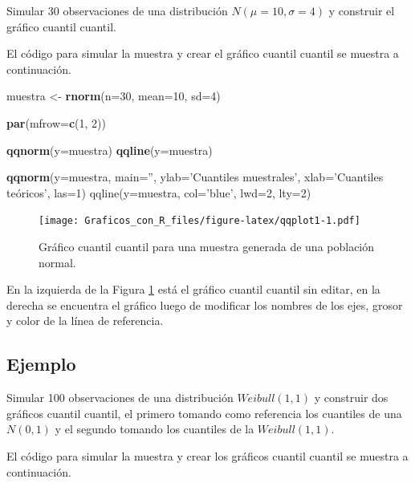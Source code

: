 \documentclass[10pt,]{krantz}
\makeatletter
\newenvironment{Shaded}{\begin{snugshade}}{\end{snugshade}}
\newcommand{\KeywordTok}[1]{\textcolor[rgb]{0.13,0.29,0.53}{\textbf{#1}}}
\newcommand{\DataTypeTok}[1]{\textcolor[rgb]{0.13,0.29,0.53}{#1}}
\newcommand{\DecValTok}[1]{\textcolor[rgb]{0.00,0.00,0.81}{#1}}
\newcommand{\StringTok}[1]{\textcolor[rgb]{0.31,0.60,0.02}{#1}}
\newcommand{\NormalTok}[1]{#1}
\newenvironment{kframe}{%
\medskip{}
\setlength{\fboxsep}{.8em}
 \def\at@end@of@kframe{}%
 \ifinner\ifhmode%
  \def\at@end@of@kframe{\end{minipage}}%
  \begin{minipage}{\columnwidth}%
 \fi\fi%
 \def\FrameCommand##1{\hskip\@totalleftmargin \hskip-\fboxsep
 \colorbox{shadecolor}{##1}\hskip-\fboxsep
     \hskip-\linewidth \hskip-\@totalleftmargin \hskip\columnwidth}%
 \MakeFramed {\advance\hsize-\width
   \@totalleftmargin\z@ \linewidth\hsize
   \@setminipage}}%
 {\par\unskip\endMakeFramed%
 \at@end@of@kframe}
\renewenvironment{Shaded}{\begin{kframe}}{\end{kframe}}
\makeatother
\begin{document}
Simular 30 observaciones de una distribución \(N(\mu=10, \sigma=4)\) y
construir el gráfico cuantil cuantil.

El código para simular la muestra y crear el gráfico cuantil cuantil se
muestra a continuación.

\begin{Shaded}
\begin{Highlighting}[]
\NormalTok{muestra <-}\StringTok{ }\KeywordTok{rnorm}\NormalTok{(}\DataTypeTok{n=}\DecValTok{30}\NormalTok{, }\DataTypeTok{mean=}\DecValTok{10}\NormalTok{, }\DataTypeTok{sd=}\DecValTok{4}\NormalTok{)}

\KeywordTok{par}\NormalTok{(}\DataTypeTok{mfrow=}\KeywordTok{c}\NormalTok{(}\DecValTok{1}\NormalTok{, }\DecValTok{2}\NormalTok{))}

\KeywordTok{qqnorm}\NormalTok{(}\DataTypeTok{y=}\NormalTok{muestra)}
\KeywordTok{qqline}\NormalTok{(}\DataTypeTok{y=}\NormalTok{muestra)}

\KeywordTok{qqnorm}\NormalTok{(}\DataTypeTok{y=}\NormalTok{muestra, }\DataTypeTok{main=}\StringTok{''}\NormalTok{, }\DataTypeTok{ylab=}\StringTok{'Cuantiles muestrales'}\NormalTok{,}
       \DataTypeTok{xlab=}\StringTok{'Cuantiles teóricos', las=1)}
\StringTok{qqline(y=muestra, col='}\NormalTok{blue}\StringTok{', lwd=2, lty=2)}
\end{Highlighting}
\end{Shaded}

\begin{figure}
\centering
\texttt{[image: Graficos\_con\_R\_files/figure-latex/qqplot1-1.pdf]}
\caption{\label{fig:qqplot1}Gráfico cuantil cuantil para una muestra
generada de una población normal.}
\end{figure}

En la izquierda de la Figura \ref{fig:qqplot1} está el gráfico cuantil
cuantil sin editar, en la derecha se encuentra el gráfico luego de
modificar los nombres de los ejes, grosor y color de la línea de
referencia.

\subsection*{Ejemplo}\label{ejemplo-5}


Simular 100 observaciones de una distribución \(Weibull(1,1)\) y
construir dos gráficos cuantil cuantil, el primero tomando como
referencia los cuantiles de una \(N(0,1)\) y el segundo tomando los
cuantiles de la \(Weibull(1,1)\).

El código para simular la muestra y crear los gráficos cuantil cuantil
se muestra a continuación.
\end{document}
